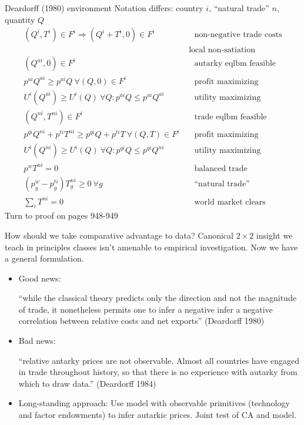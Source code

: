 \documentclass[10pt,notes=hide]{beamer}
\begin{document}
\begin{frame}{Deardorff (1980) environment}
Notation differs: country $i$, ``natural trade'' $n$, quantity $Q$
{\small
\begin{align}
(Q^i,T^i) \in F^i \Rightarrow (Q^i+T^i,0) \in F^i &\quad \text{non-negative trade costs}\\
&\text{ local non-satiation } \\
(Q^{ai},0) \in F^i &\quad \text{autarky eqlbm feasible} \\
p^{ai} Q^{ai} \geq p^{ai} Q \ \forall (Q,0) \in F^i &\quad \text{profit maximizing} \\
U^i(Q^{ai}) \geq U^i(Q) \ \forall Q: p^{ai} Q \leq p^{ai} Q^{ai} &\quad \text{utility maximizing} \\
(Q^{ni},T^{ni}) \in F^i &\quad \text{trade eqlbm feasible} \\
p^{qi} Q^{ni} +p^{ti}T^{ni} \geq p^{qi} Q +p^{ti}T \ \forall (Q,T) \in F^i &\quad \text{profit maximizing} \\
U^i(Q^{ni}) \geq U^i(Q) \ \forall Q: p^{qi} Q \leq p^{qi} Q^{ni} &\quad \text{utility maximizing} \\
p^w T^{ni} = 0  &\quad \text{balanced trade} \\
(p^w_g - p^{ti}_g) T_g^{ni} \geq 0 \ \forall g &\quad \text{``natural trade''} \\
\sum_i T^{ni} = 0 &\quad \text{world market clears}
\end{align}
{\footnotesize Turn to proof on pages 948-949}
}
\end{frame}
\begin{frame}{How should we take comparative advantage to data?}
Canonical $2\times2$ insight we teach in principles classes isn't amenable to empirical investigation.
Now we have a general formulation.
\begin{itemize}
	\item Good news: {``while the classical theory predicts only the direction and not the magnitude of trade, it nonetheless permits one to infer a negative infer a negative correlation between relative costs and net exports'' (Deardorff 1980) \par}
	\item Bad news: {``relative antarky prices are not observable. Almost all countries have engaged in trade throughout history, so that there is no experience with autarky from which to draw data.'' (Deardorff 1984) \par}
	\item Long-standing approach: Use model with observable primitives (technology and factor endowments) to infer autarkic prices. Joint test of CA and model.
\end{itemize}
\end{frame}
\end{document}
